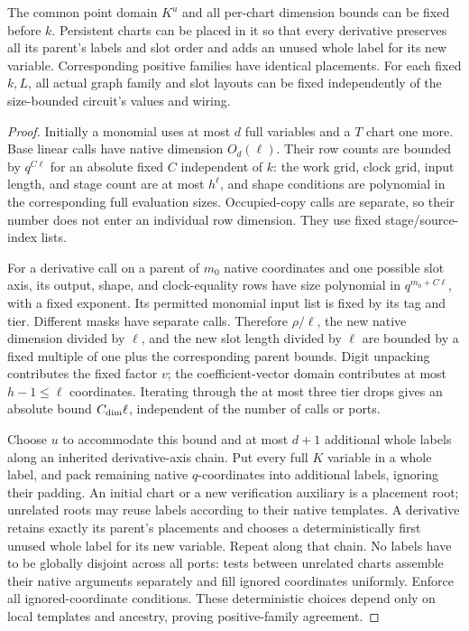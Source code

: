 \begin{lemma}
\label{ia:placements}
The common point domain $K^u$ and all per-chart dimension bounds can
be fixed before $k$.  Persistent charts can be placed in it so that
every derivative preserves all its parent's labels and slot order
and adds an unused whole label for its new variable.  Corresponding
positive families have identical placements.  For each fixed $k,L$,
all actual graph family and slot layouts can be fixed independently
of the size-bounded circuit's values and wiring.
\end{lemma}

\begin{proof}
Initially a monomial uses at most $d$ full variables and a $T$ chart
one more.  Base linear calls have native dimension $O_d(\ell)$.
Their row counts are bounded by $q^{C\ell}$ for an absolute fixed
$C$ independent of $k$: the work grid, clock grid, input length, and
stage count are at most $h^\ell$, and shape conditions are polynomial
in the corresponding full evaluation sizes.  Occupied-copy calls
are separate, so their number does not enter an individual row
dimension.  They use fixed stage/source-index lists.

For a derivative call on a parent of $m_0$ native coordinates and
one possible slot axis, its output, shape, and clock-equality rows
have size polynomial in $q^{m_0+C\ell}$, with a fixed exponent.
Its permitted monomial input list is fixed by its tag and tier.
Different masks have separate calls.  Therefore $\rho/\ell$, the
new native dimension divided by $\ell$, and the new slot length
divided by $\ell$ are bounded by a fixed multiple of one plus the
corresponding parent bounds.  Digit unpacking contributes the fixed
factor $v$; the coefficient-vector domain contributes at most
$h-1\le\ell$ coordinates.  Iterating through the at most three
tier drops gives an absolute bound $C_{\rm dim}\ell$, independent
of the number of calls or ports.

Choose $u$ to accommodate this bound and at most $d+1$ additional
whole labels along an inherited derivative-axis chain.  Put every
full $K$ variable in a whole label, and pack remaining native
$q$-coordinates into additional labels, ignoring their padding.
An initial chart or a new verification auxiliary is a placement
root; unrelated roots may reuse labels according to their native
templates.  A derivative retains exactly its parent's placements
and chooses a deterministically first unused whole label for its
new variable.  Repeat along that chain.  No labels have to be
globally disjoint across all ports: tests between unrelated charts
assemble their native arguments separately and fill ignored
coordinates uniformly.  Enforce all ignored-coordinate conditions.
These deterministic choices depend only on local templates and
ancestry, proving positive-family agreement.


\end{proof}
